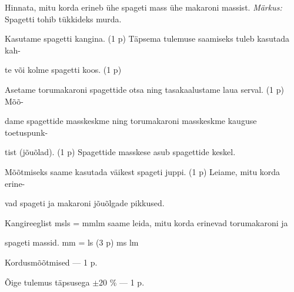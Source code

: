 
Hinnata, mitu korda erineb ühe spageti mass ühe makaroni massist.
\textit{Märkus:} Spagetti tohib tükkideks murda.

\hint

\solu
Kasutame spagetti kangina. (1 p) Täpsema tulemuse saamiseks tuleb kasutada kah-

te või kolme spagetti koos. (1 p)

Asetame torumakaroni spagettide otsa ning tasakaalustame laua serval. (1 p) Mõõ-

dame spagettide masskeskme ning torumakaroni masskeskme kauguse toetuspunk-

tist (jõuõlad). (1 p) Spagettide masskese asub spagettide keskel.

Mõõtmiseks saame kasutada väikest spageti juppi. (1 p) Leiame, mitu korda erine-

vad spageti ja makaroni jõuõlgade pikkused.

Kangireeglist msls = mmlm saame leida, mitu korda erinevad torumakaroni ja

spageti massid. mm = ls (3 p) ms lm

Kordusmõõtmised --- 1 p.

Õige tulemus täpsusega $\pm$20 \% --- 1 p.
\probend
